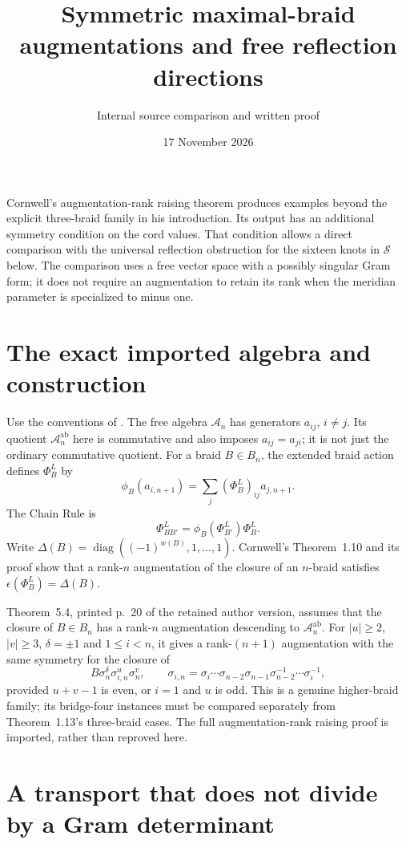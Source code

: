\documentclass[11pt]{article}
\title{Symmetric maximal-braid augmentations and free reflection directions}
\author{Internal source comparison and written proof}
\date{17 November 2026}
\begin{document}
\maketitle

Cornwell's augmentation-rank raising theorem produces examples beyond
the explicit three-braid family in his introduction. Its output has
an additional symmetry condition on the cord values. That condition
allows a direct comparison with the universal reflection obstruction
for the sixteen knots in $\mathcal S$ below.
The comparison uses a free vector space with a possibly singular
Gram form; it does not require an augmentation to retain its rank
when the meridian parameter is specialized to minus one.

\section{The exact imported algebra and construction}

Use the conventions of \cite[Sections~2.2 and~5.2]{cornwell}.
The free algebra $\mathcal A_n$ has generators $a_{ij}$,
$i\ne j$. Its quotient $\mathcal A_n^{\mathrm{ab}}$ here is
commutative and also imposes $a_{ij}=a_{ji}$; it is not just
the ordinary commutative quotient. For a braid $B\in B_n$,
the extended braid action defines $\Phi_B^L$ by
\[
 \phi_B(a_{i,n+1})=\sum_j(\Phi_B^L)_{ij}a_{j,n+1}.
\]
The Chain Rule is
\[
 \Phi_{BB'}^L=\phi_B(\Phi_{B'}^L)\Phi_B^L.
\]
Write $\Delta(B)=\operatorname{diag}((-1)^{w(B)},1,\ldots,1)$.
Cornwell's Theorem~1.10 and its proof show that a rank-$n$
augmentation of the closure of an $n$-braid satisfies
$\epsilon(\Phi_B^L)=\Delta(B)$.

Theorem~5.4, printed p.~20 of the retained author version,
assumes that the closure of $B\in B_n$ has a rank-$n$
augmentation descending to $\mathcal A_n^{\mathrm{ab}}$.
For $|u|\ge2$, $|v|\ge3$, $\delta=\pm1$ and $1\le i<n$,
it gives a rank-$(n+1)$ augmentation with the same symmetry
for the closure of
\[
 B\sigma_n^\delta\sigma_{i,n}^u\sigma_n^v,
 \qquad
 \sigma_{i,n}=\sigma_i\cdots\sigma_{n-2}\sigma_{n-1}
                 \sigma_{n-2}^{-1}\cdots\sigma_i^{-1},
\]
provided $u+v-1$ is even, or $i=1$ and $u$ is odd.
This is a genuine higher-braid family; its bridge-four instances
must be compared separately from Theorem~1.13's three-braid cases.
The full augmentation-rank raising proof is imported, rather than
reproved here.

\section{A transport that does not divide by a Gram determinant}
\end{document}

